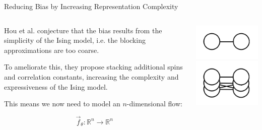 \documentclass[aspectratio=169, 12pt]{beamer}
\begin{document}
\begin{frame}{Reducing Bias by Increasing Representation Complexity}

    \begin{columns}
        \begin{column}{.6\textwidth}

            Hou et al. conjecture that the bias results from the simplicity of the Ising model, i.e. the blocking approximations are too coarse. 

            \vspace{1em}
            
            To ameliorate this, they propose stacking additional spins and correlation constants, increasing the complexity and expressiveness of the Ising model. 

            \vspace{1em}

            This means we now need to model an $n$-dimensional flow:

            \[
            \vec{f}_\theta : \mathbb{R}^n \rightarrow \mathbb{R}^n
            \]

            
        \end{column}
        \begin{column}{.4\textwidth}
            \begin{center}
                \includegraphics[]{images/a1-edge.png}
                \includegraphics[]{images/a1e-edge.png}
            \end{center}
        \end{column}
    \end{columns}

\end{frame}
\end{document}
